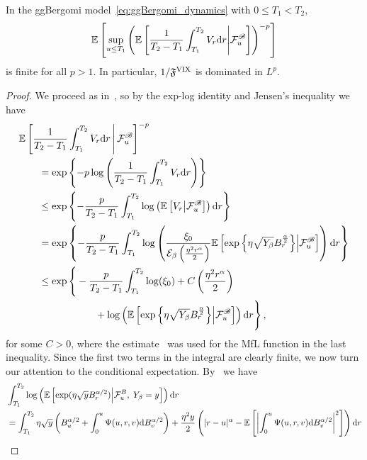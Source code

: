 \begin{lemma}\label{lem:AssOneAsy}
    In the ggBergomi model~\eqref{eq:ggBergomi_dynamics} with $0 \leq T_1<T_2$,
    \[
    \mathbb{E}\left[\sup _{u \leq T_1}\left(\mathbb{E}\left[\frac{1}{T_2-T_1} \int_{T_1}^{T_2} V_r \mathrm{d} r\middle\vert \mathcal{F}^{\mathscr{B}}_u\right]\right)^{-p}\right]
    \]
    is finite for all $p>1$. In particular, $1 / \mathfrak{F}^{\mathrm{VIX}}$ is dominated in $L^p$.
\end{lemma}
\begin{proof}
    We proceed as in~\cite[Lemma~6.14]{Jacquier2021RoughOptions}, so by the exp-log identity and Jensen's inequality we have
    \begin{align*}
    &\mathbb{E}\left[\frac{1}{T_2-T_1} \int_{T_1}^{T_2} V_r \mathrm{d} r \, \middle\vert \, \mathcal{F}^{\mathscr{B}}_u\right]^{-p} \\
    &\qquad = \exp \left\{-p \log \left(\frac{1}{T_2-T_1} \int_{T_1}^{T_2} V_r \mathrm{d} r\right)\right\} \\
    &\qquad \leq \exp \left\{-\frac{p}{T_2-T_1} \int_{T_1}^{T_2} \log \left(\mathbb{E}\left[V_r\middle\vert \mathcal{F}^{\mathscr{B}}_u\right]\right) \mathrm{d} r\right\} \\
    &\qquad = \exp \left\{-\frac{p}{T_2-T_1} \int_{T_1}^{T_2} \log \left(\frac{\xi_0}{\mathcal{E}_{\beta}\left(\frac{\eta^2 r^\alpha}{2}\right)}\mathbb{E}\left[\exp\left\{\eta\sqrt{Y_{\beta}} B^{\frac\alpha2}_r\right\}\middle\vert \mathcal{F}^{\mathscr{B}}_u\right]\right) \mathrm{d} r\right\} \\
    &\qquad  \leq \exp \Bigg\{-\frac{p}{T_2-T_1} \int_{T_1}^{T_2} \log(\xi_0) + C\left(\frac{\eta^2 r^\alpha}{2}\right) \\
    &\qquad  \hspace*{2cm} + \log \left(\mathbb{E}\left[\exp\left\{\eta\sqrt{Y_{\beta}} B^{\frac\alpha2}_r\right\}\middle\vert \mathcal{F}^{\mathscr{B}}_u\right]\right) \mathrm{d} r\Bigg\}\,,
    \end{align*}
    for some $C>0$, where the estimate~\cite[Theorem~9]{Jia2019SomeFunction} was used for the MfL function in the last inequality. Since the first two terms in the integral are clearly finite, we now turn our attention to the conditional expectation. By~\cite[Theorem 3.1]{Fink2013ConditionalMotion} we have
\begin{align*}
    &\int_{T_1}^{T_2}\log\left(\EE\left[\exp(\eta\sqrt{y} B_r^{\alpha/2})\middle\vert \Ff_u^B,\; Y_\beta = y\right]\right) \D r \\
    &= \int_{T_1}^{T_2} \eta\sqrt{y}\left(B_u^{\alpha/2} + \int_0^u \Psi(u,r,v)\D B_v^{\alpha/2}\right) + \frac{\eta^2 y}{2}\left(|r-u|^\alpha - \EE\left[\left|\int_0^u \Psi(u,r,v)\D B_v^{\alpha/2}\right|^2\right]\right) \D r

\end{align*}
\end{proof}
